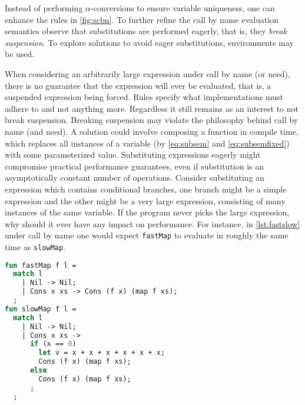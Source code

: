\documentclass[11pt,oneside,a4paper]{report}
\begin{document}
Instead of performing $\alpha$-conversions to ensure variable uniqueness, one can enhance the rules in \autoref{fig:scbn}.%
To further refine the call by name evaluation semantics observe that substitutions are performed eagerly, that is, they \textit{break suspension}.
To explore solutions to avoid eager substitutions, environments may be used.
\begin{remark}
  When considering an arbitrarily large expression under call by name (or need), there is no guarantee that the expression will ever be evaluated, that is, a suspended expression being forced.
  Rules specify what implementations must adhere to and not anything more.
  Regardless it still remains as an interest to not break suspension.
  Breaking suspension may violate the philosophy behind call by name (and need).
  A solution could involve composing a function in compile time, which replaces all instances of a variable (by \autoref{eq:subsem} and \autoref{eq:subsemfixed}) with some parameterized value.
  Substituting expressions eagerly might compromise practical performance guarantees, even if substitution is an asymptotically constant number of operations.
  Consider substituting an expression which contains conditional branches, one branch might be a simple expression and the other might be a very large expression, consisting of many instances of the same variable.
  If the program never picks the large expression, why should it ever have any impact on performance.
  For instance, in \autoref{lst:fastslow} under call by name one would expect \texttt{fastMap} to evaluate in roughly the same time as \texttt{slowMap}.
\begin{lstlisting}[language=ML,caption={Performance considerations in substitution},label={lst:fastslow},mathescape=true]
fun fastMap f l =
  match l
    | Nil -> Nil;
    | Cons x xs -> Cons (f x) (map f xs);
  ;
fun slowMap f l =
  match l
    | Nil -> Nil;
    | Cons x xs -> 
      if (x == 0)
        let v = x + x + x + x + x + x; 
        Cons (f x) (map f xs);
      else
        Cons (f x) (map f xs);
      ;
  ;
\end{lstlisting}
\end{remark}
\end{document}
